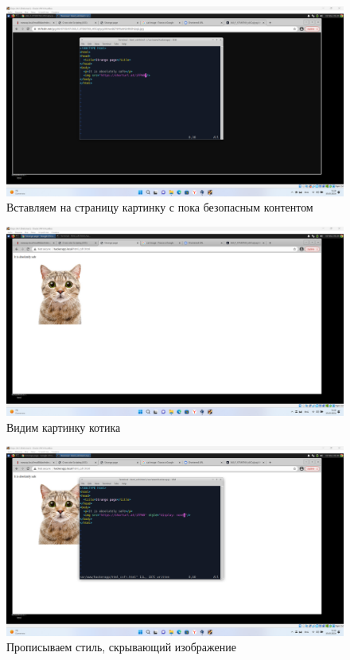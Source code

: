 \documentclass[a4paper]{article}
\begin{document}
  \begin{figure}[H]
    \centering
    \includegraphics[width=\textwidth]{Screenshot_37}
    \caption{Вставляем на страницу картинку с пока безопасным контентом}
  \end{figure}

  \begin{figure}[H]
    \centering
    \includegraphics[width=\textwidth]{Screenshot_38}
    \caption{Видим картинку котика}
  \end{figure}

  \begin{figure}[H]
    \centering
    \includegraphics[width=\textwidth]{Screenshot_39}
    \caption{Прописываем стиль, скрывающий изображение}
  \end{figure}
\end{document}
